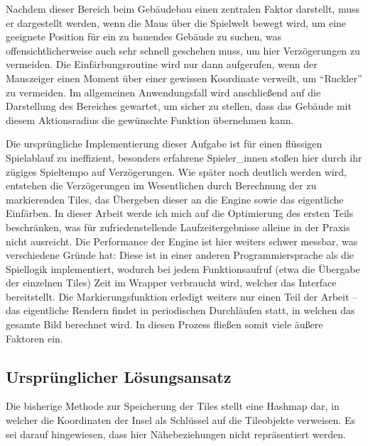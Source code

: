 \documentclass[%
			fontsize=12pt,%
			paper=a4,%
			DIV11,
			liststotoc,
			bibtotoc,
			draft=false,%
			titlepage
			]{scrartcl}
\begin{document}
Nachdem dieser Bereich beim Gebäudebau einen zentralen Faktor darstellt, muss er dargestellt werden, wenn die Maus über die Spielwelt bewegt wird, um eine geeignete Position für ein zu bauendes Gebäude zu suchen, was offensichtlicherweise auch sehr schnell geschehen muss, um hier Verzögerungen zu vermeiden.
Die Einfärbungsroutine wird nur dann aufgerufen, wenn der Mauszeiger einen Moment über einer gewissen Koordinate verweilt, um "`Ruckler"' zu vermeiden. Im allgemeinen Anwendungsfall wird anschließend auf die Darstellung des Bereiches gewartet, um sicher zu stellen, dass das Gebäude mit diesem Aktionsradius die gewünschte Funktion übernehmen kann.


Die ursprüngliche Implementierung dieser Aufgabe ist für einen flüssigen Spielablauf zu ineffizient, besonders erfahrene Spieler\_innen stoßen hier durch ihr zügiges Spieltempo auf Verzögerungen.
Wie später noch deutlich werden wird, entstehen die Verzögerungen im Wesentlichen durch Berechnung der zu markierenden Tiles, das Übergeben dieser an die Engine sowie das eigentliche Einfärben. 
In dieser Arbeit werde ich mich auf die Optimierung des ersten Teils beschränken, was für zufriedenstellende Laufzeitergebnisse alleine in der Praxis nicht ausreicht.
Die Performance der Engine ist hier weiters schwer messbar, was verschiedene Gründe hat:
Diese ist in einer anderen Programmiersprache als die Spiellogik implementiert, wodurch bei jedem Funktionsaufruf (etwa die Übergabe der einzelnen Tiles) Zeit im Wrapper verbraucht wird, welcher das Interface bereitstellt.
Die Markierungsfunktion erledigt weiters nur einen Teil der Arbeit -- das eigentliche Rendern findet in periodischen Durchläufen statt, in welchen das gesamte Bild berechnet wird.
In diesen Prozess fließen somit viele äußere Faktoren ein. 

\subsection{Ursprünglicher Lösungsansatz}

Die bisherige Methode zur Speicherung der Tiles stellt eine Hashmap dar, in welcher die Koordinaten der Insel als Schlüssel auf die Tileobjekte verweisen. 
Es sei darauf hingewiesen, dass hier Nähebeziehungen nicht repräsentiert werden.
\end{document}
